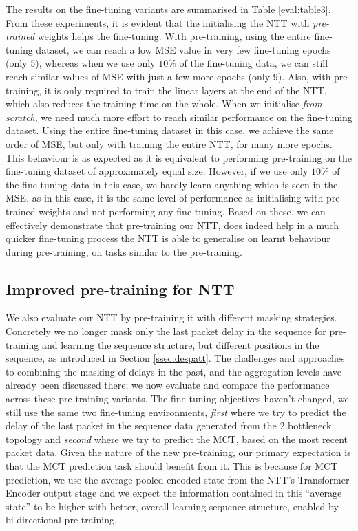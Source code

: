 The results on the fine-tuning variants are summarised in Table \ref{eval:table3}. From these experiments, it is evident that the initialising the NTT with \emph{pre-trained} weights helps the fine-tuning. With pre-training, using the entire fine-tuning dataset, we can reach a low MSE value in very few fine-tuning epochs (only $5$), whereas when we use only $10\%$ of the fine-tuning data, we can still reach similar values of MSE with just a few more epochs (only $9$). Also, with pre-training, it is only required to train the linear layers at the end of the NTT, which also reduces the training time on the whole. When we initialise \emph{from scratch}, we need much more effort to reach similar performance on the fine-tuning dataset. Using the entire fine-tuning dataset in this case, we achieve the same order of MSE, but only with training the entire NTT, for many more epochs. This behaviour is as expected as it is equivalent to performing pre-training on the fine-tuning dataset of approximately equal size. However, if we use only $10\%$ of the fine-tuning data in this case, we hardly learn anything which is seen in the MSE, as in this case, it is the same level of performance as initialising with pre-trained weights and not performing any fine-tuning. Based on these, we can effectively demonstrate that pre-training our NTT, does indeed help in a much quicker fine-tuning process \ie the NTT is able to generalise on learnt behaviour during pre-training, on tasks similar to the pre-training.


\subsection{Improved pre-training for NTT}
\label{ssec:impptt}

We also evaluate our NTT by pre-training it with different masking strategies. Concretely we no longer mask only the last packet delay in the sequence for pre-training and learning the sequence structure, but different positions in the sequence, as introduced in Section \ref{ssec:despatt}. The challenges and approaches to combining the masking of delays in the past, and the aggregation levels have already been discussed there; we now evaluate and compare the performance across these pre-training variants. The fine-tuning objectives haven't changed, we still use the same two fine-tuning environments, \emph{first} where we try to predict the delay of the last packet in the sequence data generated from the $2$ bottleneck topology and \emph{second} where we try to predict the MCT, based on the most recent packet data. Given the nature of the new pre-training, our primary expectation  is that the MCT prediction task should benefit from it. This is because for MCT prediction, we use the average pooled encoded state from the NTT's Transformer Encoder output stage and we expect the information contained in this ``average state'' to be higher with better, overall learning sequence structure, enabled by bi-directional pre-training. 

